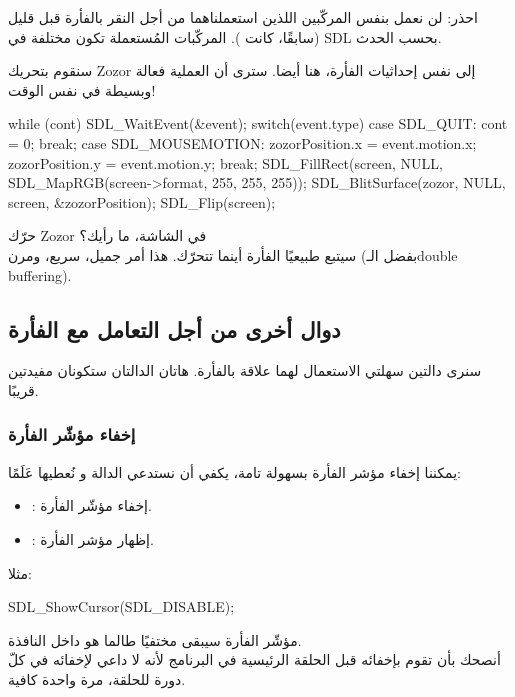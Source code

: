 \begin{warning}
احذر: لن نعمل بنفس المركّبين اللذين استعملناهما من أجل النقر بالفأرة قبل قليل (سابقًا، كانت
).
المركّبات المُستعملة تكون مختلفة في
\textenglish{SDL}
بحسب الحدث.
\end{warning}

سنقوم بتحريك
\textenglish{Zozor}
إلى نفس إحداثيات الفأرة، هنا أيضا. سترى أن العملية فعالة وبسيطة في نفس الوقت!

\begin{Csource}
while (cont)
{
	SDL_WaitEvent(&event);
	switch(event.type)
	{
		case SDL_QUIT:
		cont = 0;
		break;
		case SDL_MOUSEMOTION:
		zozorPosition.x = event.motion.x;
		zozorPosition.y = event.motion.y;
		break;
	}
	SDL_FillRect(screen, NULL, SDL_MapRGB(screen->format, 255, 255, 255));
	SDL_BlitSurface(zozor, NULL, screen, &zozorPosition); 
	SDL_Flip(screen);
}
\end{Csource}

حرّك
\textenglish{Zozor}
في الشاشة، ما رأيك؟\\
سيتبع طبيعيًا الفأرة أينما تتحرّك. هذا أمر جميل، سريع، ومرن (بفضل الـ\textenglish{double buffering}).

\subsection{دوال أخرى من أجل التعامل مع الفأرة}

سنرى دالتين سهلتي الاستعمال لهما علاقة بالفأرة. هاتان الدالتان ستكونان مفيدتين قريبًا.

\subsubsection{إخفاء مؤشّر الفأرة}

يمكننا إخفاء مؤشر الفأرة بسهولة تامة، يكفي أن نستدعي الدالة
و نُعطيها عَلَمًا:

\begin{itemize}
	\item {}:
	إخفاء مؤشّر الفأرة.
	\item {}:
	إظهار مؤشر الفأرة.
\end{itemize}
مثلا:

\begin{Csource}
SDL_ShowCursor(SDL_DISABLE);
\end{Csource}

مؤشّر الفأرة سيبقى مختفيًا طالما هو داخل النافذة.\\
أنصحك بأن تقوم بإخفائه قبل الحلقة الرئيسية في البرنامج لأنه لا داعي لإخفائه في كلّ دورة للحلقة، مرة واحدة كافية.

